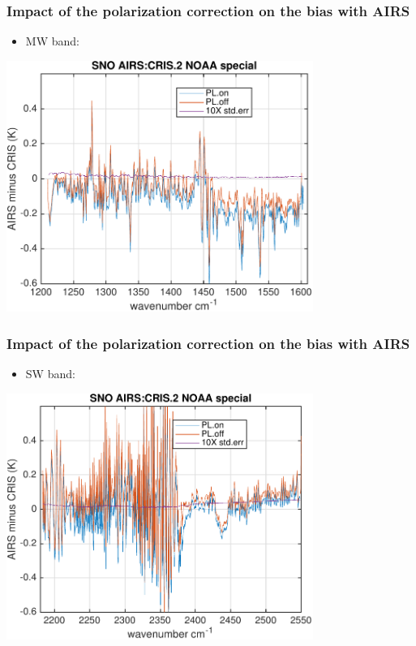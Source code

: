 \documentclass[10pt,t]{beamer} \usepackage[utf8]{inputenc}
\begin{document}
\begin{frame}
  \frametitle{Impact of the polarization correction on the bias with AIRS}
  \vspace{-0.125in} %
  \begin{itemize}
     \item MW band: 
  \end{itemize}
  
  \begin{center}
    \noindent\includegraphics[width=0.75\textwidth]{Figs/sno_airs_cris2_bias_spectrum_polz_mw.pdf}
  \end{center}
   
\end{frame}
\begin{frame}
  \frametitle{Impact of the polarization correction on the bias with AIRS}
  \vspace{-0.125in} %
  \begin{itemize}
     \item SW band: 
  \end{itemize}
  
  \begin{center}
    \noindent\includegraphics[width=0.75\textwidth]{Figs/sno_airs_cris2_bias_spectrum_polz_sw.pdf}
  \end{center}
   
\end{frame}
\end{document}
